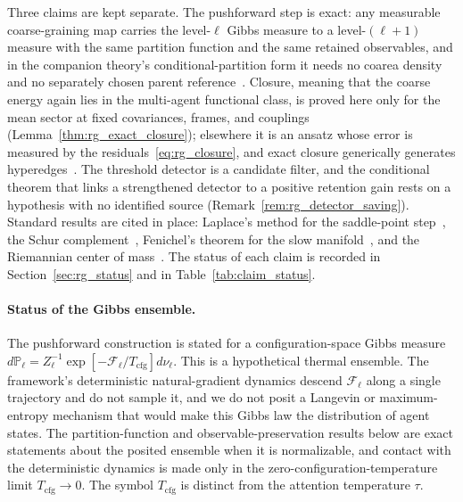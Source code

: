 Three claims are kept separate. The pushforward step is exact: any measurable coarse-graining map carries the level-$\ell$ Gibbs measure to a level-$(\ell+1)$ measure with the same partition function and the same retained observables, and in the companion theory's conditional-partition form it needs no coarea density and no separately chosen parent reference~\cite[Ch.~11]{DennisGaugeVFE2026}. Closure, meaning that the coarse energy again lies in the multi-agent functional class, is proved here only for the mean sector at fixed covariances, frames, and couplings (Lemma~\ref{thm:rg_exact_closure}); elsewhere it is an ansatz whose error is measured by the residuals~\eqref{eq:rg_closure}, and exact closure generically generates hyperedges~\cite[Ch.~11]{DennisGaugeVFE2026}. The threshold detector is a candidate filter, and the conditional theorem that links a strengthened detector to a positive retention gain rests on a hypothesis with no identified source (Remark~\ref{rem:rg_detector_saving}). Standard results are cited in place: Laplace's method for the saddle-point step~\cite{wong2001asymptotic}, the Schur complement~\cite{HornJohnson2013}, Fenichel's theorem for the slow manifold~\cite{fenichel1979geometric}, and the Riemannian center of mass~\cite{Karcher1977, Afsari2011}. The status of each claim is recorded in Section~\ref{sec:rg_status} and in Table~\ref{tab:claim_status}.

\paragraph{Status of the Gibbs ensemble.}
The pushforward construction is stated for a configuration-space Gibbs measure $d\mathbb{P}_\ell = Z_\ell^{-1}\exp[-\mathcal{F}_\ell/T_{\mathrm{cfg}}]d\nu_\ell$. This is a hypothetical thermal ensemble. The framework's deterministic natural-gradient dynamics descend $\mathcal{F}_\ell$ along a single trajectory and do not sample it, and we do not posit a Langevin or maximum-entropy mechanism that would make this Gibbs law the distribution of agent states. The partition-function and observable-preservation results below are exact statements about the posited ensemble when it is normalizable, and contact with the deterministic dynamics is made only in the zero-configuration-temperature limit $T_{\mathrm{cfg}}\to0$. The symbol $T_{\mathrm{cfg}}$ is distinct from the attention temperature $\tau$.

